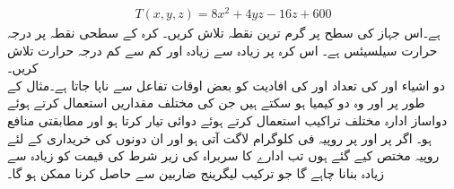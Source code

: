 \begin{align*}
T(x,y,z)=8x^2+4yz-16z+600
\end{align*}
ہے۔اس جہاز کی  سطح پر گرم ترین نقطہ تلاش کریں۔
کرہ   کے سطحی نقطہ  پر درجہ حرارت   سیلسیئس ہے۔ اس کرہ پر زیادہ سے زیادہ اور کم سے کم درجہ حرارت تلاش کریں۔
\\
دو   اشیاء  اور  کی تعداد  اور  کی افادیت   کو بعض اوقات تفاعل   سے ناپا جاتا ہے۔مثال کے طور پر  اور وہ دو   کیمیا ہو سکتے ہیں جن کی مختلف مقداریں  استعمال کرتے ہوئے   دواساز ادارہ  مختلف  تراکیب   استعمال  کرتے ہوئے    دوائی تیار کرتا ہو اور مطابقتی  منافع  ہو۔ اگر   پر  اور  پر  روپیہ فی کلوگرام لاگت آتی ہو اور ان دونوں کی خریداری کے لئے   روپیہ مختص کیے  گئے ہوں تب ادارے  کا سربراہ  کی زیر  شرط   کی قیمت کو زیادہ سے زیادہ بنانا چاہے گا جو  ترکیب لیگرینج ضاربین سے حاصل کرنا ممکن ہو گا۔

